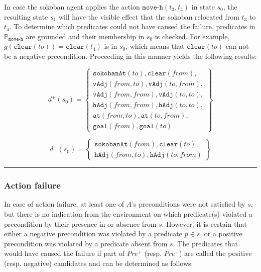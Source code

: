 \documentclass[../../Master.tex]{subfiles}
\begin{document}
\begin{example} \label{ex:moveSucceeded}
    In case the sokoban agent applies the action $\texttt{move-h}(t_3, t_4)$ in state $s_0$, the resulting state $s_1$ will have the visible effect that the sokoban relocated from $t_3$ to $t_4$. To determine which predicates could not have caused the failure, predicates in $\mathbb{P}_{\texttt{move-h}}$ are grounded and their membership in $s_0$ is checked. For example, $g \left( \texttt{clear}(to) \right) = \texttt{clear}\left( t_4 \right)$ is in $s_0$, which means that $\texttt{clear}(to)$ can not be a negative precondition. Proceeding in this manner yields the following results:

    \begin{equation*}
        d^+(s_0) = \left\{
            \begin{gathered}
                \texttt{sokobanAt}(to), \texttt{clear}(from), \\
                \texttt{vAdj}(from, to), \texttt{vAdj}(to, from), \\
                \texttt{vAdj}(from, from), \texttt{vAdj}(to, to), \\
                \texttt{hAdj}(from, from), \texttt{hAdj}(to, to), \\
                \texttt{at}(from, to), \texttt{at}(to, from), \\
                \texttt{goal}(from), \texttt{goal}(to)
            \end{gathered}
        \right\}
    \end{equation*}

    \begin{equation*}
        d^-(s_0) = \left\{
            \begin{gathered}
                \texttt{sokobanAt}(from), \texttt{clear}(to), \\
                \texttt{hAdj}(from, to), \texttt{hAdj}(to, from)
            \end{gathered}
        \right\}
    \end{equation*}

    \noindent\rule{\textwidth}{1pt}
\end{example}

\subsubsection*{Action failure}
In case of action failure, at least one of $A$'s preconditions were not satisfied by $s$, but there is no indication from the environment on which predicate(s) violated a precondition by their presence in or absence from $s$. However, it is certain that either a negative precondition was violated by a predicate $p \in s$, or a positive precondition was violated by a predicate absent from $s$. The predicates that would have caused the failure if part of $Pre^+$ (resp. $Pre^-$) are called the positive (resp. negative) candidates and can be determined as follows:
\end{document}

